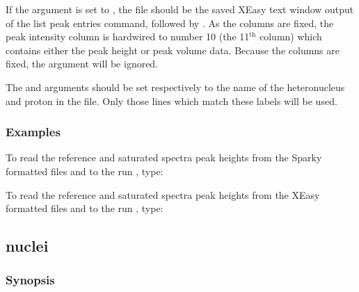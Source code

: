  If the  argument is set to , the file should be the saved XEasy text window output of the list peak entries command,  followed by .  As the columns are fixed, the peak intensity column is hardwired to number 10 (the 11$^\mathrm{th}$ column) which contains either the peak height or peak volume data.  Because the columns are fixed, the  argument will be ignored. 
  

 The  and  arguments should be set respectively to the name of the heteronucleus and proton in the file.  Only those lines which match these labels will be used. 
  

  
 \subsubsection{Examples} 

 To read the reference and saturated spectra peak heights from the Sparky formatted files  and  to the run , type: 
  



 To read the reference and saturated spectra peak heights from the XEasy formatted files  and  to the run , type: 
  



  

 \newpage 

 \subsection{nuclei} 

  
 \subsubsection{Synopsis} 

